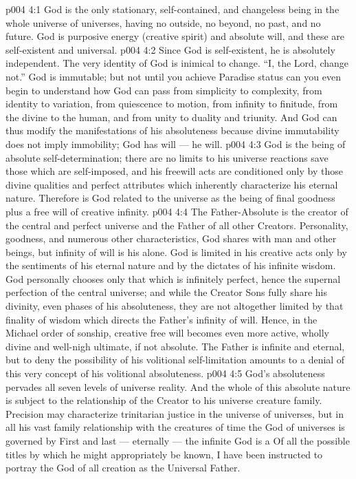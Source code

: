 \vs p004 4:1 God is the only stationary, self\hyp{}contained, and changeless being in the whole universe of universes, having no outside, no beyond, no past, and no future. God is purposive energy (creative spirit) and absolute will, and these are self\hyp{}existent and universal.
\vs p004 4:2 Since God is self\hyp{}existent, he is absolutely independent. The very identity of God is inimical to change. “I, the Lord, change not.” God is immutable; but not until you achieve Paradise status can you even begin to understand how God can pass from simplicity to complexity, from identity to variation, from quiescence to motion, from infinity to finitude, from the divine to the human, and from unity to duality and triunity. And God can thus modify the manifestations of his absoluteness because divine immutability does not imply immobility; God has will --- he  will.
\vs p004 4:3 God is the being of absolute self\hyp{}determination; there are no limits to his universe reactions save those which are self\hyp{}imposed, and his freewill acts are conditioned only by those divine qualities and perfect attributes which inherently characterize his eternal nature. Therefore is God related to the universe as the being of final goodness plus a free will of creative infinity.
\vs p004 4:4 The Father\hyp{}Absolute is the creator of the central and perfect universe and the Father of all other Creators. Personality, goodness, and numerous other characteristics, God shares with man and other beings, but infinity of will is his alone. God is limited in his creative acts only by the sentiments of his eternal nature and by the dictates of his infinite wisdom. God personally chooses only that which is infinitely perfect, hence the supernal perfection of the central universe; and while the Creator Sons fully share his divinity, even phases of his absoluteness, they are not altogether limited by that finality of wisdom which directs the Father’s infinity of will. Hence, in the Michael order of sonship, creative free will becomes even more active, wholly divine and well\hyp{}nigh ultimate, if not absolute. The Father is infinite and eternal, but to deny the possibility of his volitional self\hyp{}limitation amounts to a denial of this very concept of his volitional absoluteness.
\vs p004 4:5 \pc God’s absoluteness pervades all seven levels of universe reality. And the whole of this absolute nature is subject to the relationship of the Creator to his universe creature family. Precision may characterize trinitarian justice in the universe of universes, but in all his vast family relationship with the creatures of time the God of universes is governed by  First and last --- eternally --- the infinite God is a  Of all the possible titles by which he might appropriately be known, I have been instructed to portray the God of all creation as the Universal Father.
